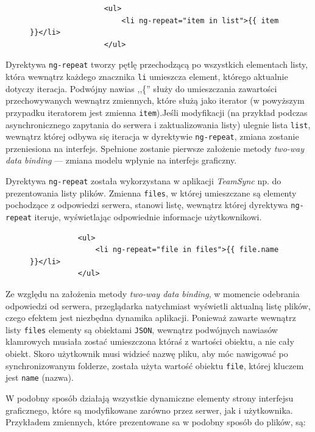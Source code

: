 \documentclass[polish,a4paper,twoside]{ppfcmthesis}
\begin{document}
\begin{figure}[htb]
\begin{verbatim}
                 <ul>
                     <li ng-repeat="item in list">{{ item }}</li>
                 </ul>
\end{verbatim}
\end{figure}

Dyrektywa \texttt{ng-repeat} tworzy pętlę przechodzącą po wszystkich elementach listy, która wewnątrz każdego znacznika \texttt{li} umieszcza element, którego aktualnie dotyczy iteracja. Podwójny nawias ,,\{'' służy do umieszczania zawartości przechowywanych wewnątrz zmiennych, które służą jako iterator (w powyższym przypadku iteratorem jest zmienna \texttt{item}).Jeśli modyfikacji (na przykład podczas asynchronicznego zapytania do serwera i zaktualizowania listy) ulegnie lista \texttt{list}, wewnątrz której odbywa się iteracja w dyrektywie \texttt{ng-repeat}, zmiana zostanie przeniesiona na interfejs. Spełnione zostanie pierwsze założenie metody \emph{two-way data binding} --- zmiana modelu wpłynie na interfejs graficzny.

Dyrektywa \texttt{ng-repeat} została wykorzystana w aplikacji \emph{TeamSync} np. do prezentowania listy plików. Zmienna \texttt{files}, w której umieszczane są elementy pochodzące z odpowiedzi serwera, stanowi listę, wewnątrz której dyrektywa \texttt{ng-repeat} iteruje, wyświetlając odpowiednie informacje użytkownikowi.

\begin{figure}[htb]
\begin{verbatim}
           <ul>
               <li ng-repeat="file in files">{{ file.name }}</li>
           </ul>
\end{verbatim}
\end{figure}

Ze względu na założenia metody \emph{two-way data binding}, w momencie odebrania odpowiedzi od serwera, przeglądarka natychmiast wyświetli aktualną listę plików, czego efektem jest niezbędna dynamika aplikacji. Ponieważ zawarte wewnątrz listy \texttt{files} elementy są obiektami \texttt{JSON}, wewnątrz podwójnych nawiasów klamrowych musiała zostać umieszczona któraś z wartości obiektu, a nie cały obiekt. Skoro użytkownik musi widzieć nazwę pliku, aby móc nawigować po synchronizowanym folderze, została użyta wartość obiektu \texttt{file}, której kluczem jest \texttt{name} (nazwa).

W podobny sposób działają wszystkie dynamiczne elementy strony interfejsu graficznego, które są modyfikowane zarówno przez serwer, jak i użytkownika. Przykładem zmiennych, które prezentowane sa w podobny sposób do plików, są:
\end{document}
